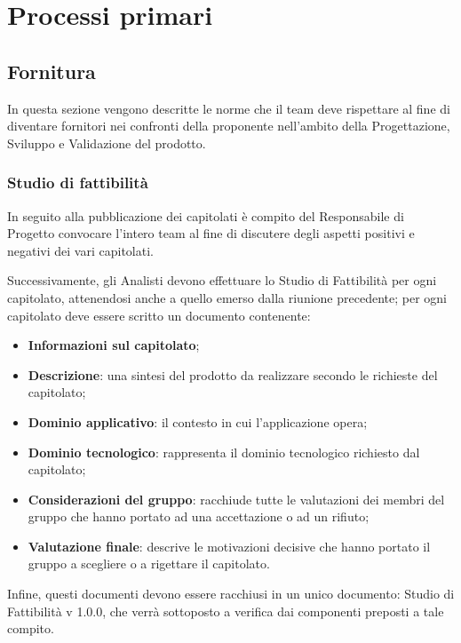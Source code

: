 \section{Processi primari}
\subsection{Fornitura}
In questa sezione vengono descritte le norme che il team deve rispettare al fine di diventare fornitori nei confronti della proponente nell'ambito della Progettazione, Sviluppo e Validazione del prodotto.
\subsubsection{Studio di fattibilità}
In seguito alla pubblicazione dei capitolati è compito del Responsabile di Progetto convocare l'intero team al fine di discutere degli aspetti positivi e negativi dei vari capitolati.

Successivamente, gli Analisti devono effettuare lo Studio di Fattibilità per ogni capitolato, attenendosi anche a quello emerso dalla riunione precedente; per ogni capitolato deve essere scritto un documento contenente:
\begin{itemize}
\item \textbf{Informazioni sul capitolato};
\item \textbf{Descrizione}: una sintesi del prodotto da realizzare secondo le richieste del capitolato;
\item \textbf{Dominio applicativo}: il contesto in cui l'applicazione opera;
\item \textbf{Dominio tecnologico}: rappresenta il dominio tecnologico richiesto dal capitolato;
\item \textbf{Considerazioni del gruppo}: racchiude tutte le valutazioni dei membri del gruppo che hanno portato ad una accettazione o ad un rifiuto;
\item \textbf{Valutazione finale}: descrive le motivazioni decisive che hanno portato il gruppo a scegliere o a rigettare il capitolato.
\end{itemize}


Infine, questi documenti devono essere racchiusi in un unico documento: Studio di Fattibilità v 1.0.0, che verrà sottoposto a verifica dai componenti preposti a tale compito.

